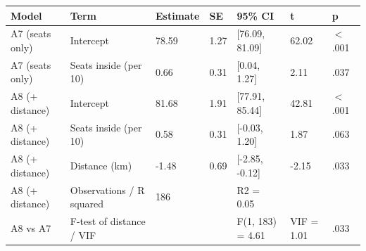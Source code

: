 \begin{tabular}{lllllll}
  \toprule
Model & Term & Estimate & SE & 95\% CI & t & p \\ 
  \midrule
A7 (seats only) & Intercept & 78.59 & 1.27 & [76.09, 81.09] & 62.02 & $<$ .001 \\ 
  A7 (seats only) & Seats inside (per 10) & 0.66 & 0.31 & [0.04, 1.27] & 2.11 & .037 \\ 
  A8 (+ distance) & Intercept & 81.68 & 1.91 & [77.91, 85.44] & 42.81 & $<$ .001 \\ 
  A8 (+ distance) & Seats inside (per 10) & 0.58 & 0.31 & [-0.03, 1.20] & 1.87 & .063 \\ 
  A8 (+ distance) & Distance (km) & -1.48 & 0.69 & [-2.85, -0.12] & -2.15 & .033 \\ 
  A8 (+ distance) & Observations / R squared & 186 &  & R2 = 0.05 &  &  \\ 
  A8 vs A7 & F-test of distance / VIF &  &  & F(1, 183) = 4.61 & VIF = 1.01 & .033 \\ 
   \bottomrule
\end{tabular}
